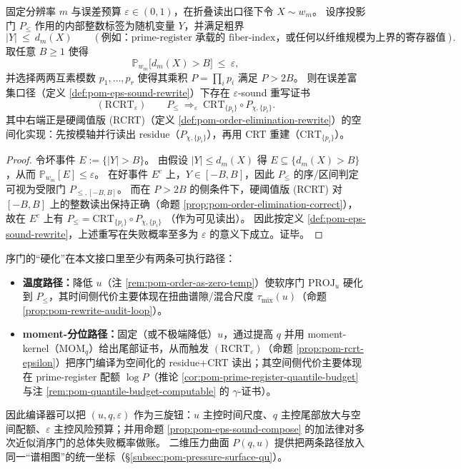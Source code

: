 \begin{proposition}\label{prop:pom-rcrt-epsilon}
固定分辨率 \(m\) 与误差预算 \(\varepsilon\in(0,1)\)，在折叠读出口径下令 \(X\sim w_m\)。
设序投影门 \(P_{\le}\) 作用的内部整数标签为随机变量 \(Y\)，并满足粗界
\[
|Y|\ \le\ d_m(X)
\qquad(\text{例如：prime-register 承载的 fiber-index，或任何以纤维规模为上界的寄存器值}).
\]
取任意 \(B\ge 1\) 使得
\[
\mathbb{P}_{w_m}\big[d_m(X)>B\big]\ \le\ \varepsilon,
\]
并选择两两互素模数 \(p_1,\dots,p_r\) 使得其乘积 \(P=\prod_i p_i\) 满足 \(P>2B\)。
则在误差富集口径（定义 \ref{def:pom-eps-sound-rewrite}）下存在 \(\varepsilon\)-sound 重写证书
\[
(\mathrm{RCRT}_\varepsilon)\qquad
P_{\le}\ \Longrightarrow_{\varepsilon}\ \mathrm{CRT}_{\{p_i\}}\circ P_{\chi,\{p_i\}}.
\]
其中右端正是硬阈值版 (RCRT)（定义 \ref{def:pom-order-elimination-rewrite}）的空间化实现：先按模轴并行读出 residue（\(P_{\chi,\{p_i\}}\)），再用 CRT 重建（\(\mathrm{CRT}_{\{p_i\}}\)）。
\end{proposition}
\begin{proof}
令坏事件 \(E:=\{|Y|>B\}\)。
由假设 \(|Y|\le d_m(X)\) 得 \(E\subseteq\{d_m(X)>B\}\)，从而
\(
\mathbb{P}_{w_m}[E]\le \varepsilon
\)。
在好事件 \(E^c\) 上，\(Y\in[-B,B]\)，因此 \(P_{\le}\) 的序/区间判定可视为受限门 \(P_{\le,[-B,B]}\)。
而在 \(P>2B\) 的侧条件下，硬阈值版 (RCRT) 对 \([-B,B]\) 上的整数读出保持正确（命题 \ref{prop:pom-order-elimination-correct}），故在 \(E^c\) 上有
\(
P_{\le}= \mathrm{CRT}_{\{p_i\}}\circ P_{\chi,\{p_i\}}
\)
（作为可见读出）。
因此按定义 \ref{def:pom-eps-sound-rewrite}，上述重写在失败概率至多为 \(\varepsilon\) 的意义下成立。证毕。
\end{proof}
\begin{remark}\label{rem:pom-hardening-u-vs-q}
序门的“硬化”在本文接口里至少有两条可执行路径：
\begin{itemize}
  \item \textbf{温度路径：}降低 \(u\)（注 \ref{rem:pom-order-as-zero-temp}）使软序门 \(\mathrm{PROJ}_u\) 硬化到 \(P_{\le}\)，其时间侧代价主要体现在扭曲谱隙/混合尺度 \(\tau_{\mathrm{mix}}(u)\)（命题 \ref{prop:pom-rewrite-audit-loop}）。
  \item \textbf{moment-分位路径：}固定（或不极端降低）\(u\)，通过提高 \(q\) 并用 moment-kernel（\(\mathrm{MOM}_q\)）给出尾部证书，从而触发 \((\mathrm{RCRT}_\varepsilon)\)（命题 \ref{prop:pom-rcrt-epsilon}）把序门编译为空间化的 residue+CRT 读出；其空间侧代价主要体现在 prime-register 配额 \(\log P\)（推论 \ref{cor:pom-prime-register-quantile-budget} 与注 \ref{rem:pom-quantile-budget-computable} 的 \(\gamma\)-证书）。
\end{itemize}
因此编译器可以把 \((u,q,\varepsilon)\) 作为三旋钮：\(u\) 主控时间尺度、\(q\) 主控尾部放大与空间配额、\(\varepsilon\) 主控风险预算；并用命题 \ref{prop:pom-eps-sound-compose} 的加法律对多次近似消序门的总体失败概率做账。
二维压力曲面 \(P(q,u)\) 提供把两条路径放入同一“谱相图”的统一坐标（\S\ref{subsec:pom-pressure-surface-qu}）。
\end{remark}

